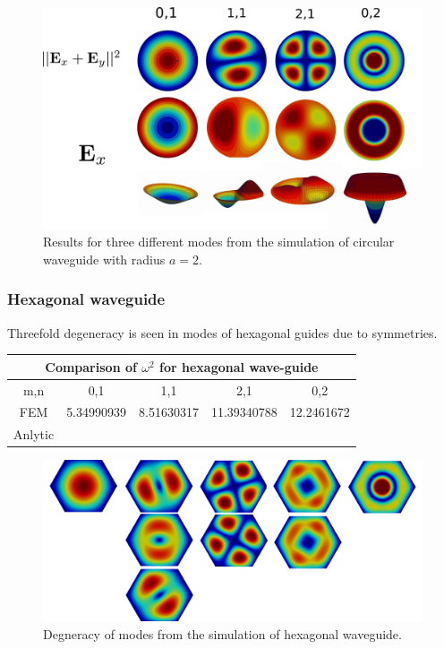 \begin{figure}
\centering
\includegraphics[scale=0.1]{./img/circular_waveguide.pdf}
\caption{Results for three different modes from the simulation of circular waveguide with radius $a=2$.}
\label{fig:circular_waveguide}
\end{figure}

\subsubsection{Hexagonal waveguide}

Threefold degeneracy is seen in modes of hexagonal guides due to symmetries.

\begin{center}
\begin{tabular}{|c|c|c|c|c|}
\hline
\multicolumn{5}{|c|}{Comparison of $\omega^2$ for hexagonal wave-guide} \\
\hline 
m,n & 0,1 & 1,1 & 2,1 & 0,2 \\ 
\hline 
FEM     & 5.34990939 & 8.51630317 & 11.39340788 & 12.2461672 \\ 
\hline 
Anlytic &  &  &  &  \\ 
\hline 
\end{tabular} 
\label{tab:hex_wav_comparison}
\end{center}

\begin{figure}
\centering
\includegraphics[scale=0.07]{./img/hexagonal_waveguide.pdf}
\caption{Degneracy of modes from the simulation of hexagonal waveguide.}
\label{fig:hexagonal_waveguide}
\end{figure}
